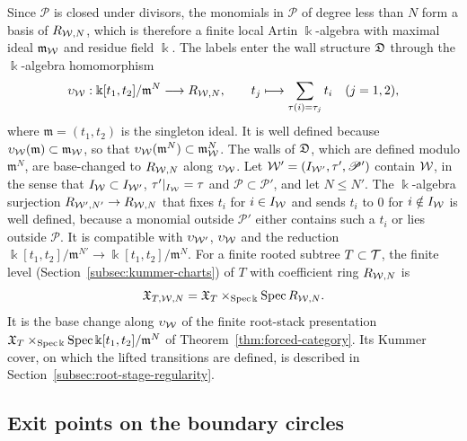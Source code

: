 Since $\mathscr P$ is closed under divisors, the monomials in $\mathscr P$ of degree less than
$N$ form a basis of $R_{\mathcal W,N}$, which is therefore a finite local Artin
$\Bbbk$-algebra with maximal ideal $\mathfrak m_\mathcal W$ and residue field
$\Bbbk$.  The labels enter the wall structure $\mathfrak D$ through the $\Bbbk$-algebra
homomorphism
\begin{equation}\label{eq:window-map}
 \upsilon_\mathcal W:\Bbbk[t_1,t_2]/\mathfrak m^N\longrightarrow R_{\mathcal W,N},
 \qquad
 t_j\longmapsto\sum_{\tau(i)=\tau_j}t_i\quad(j=1,2),
\end{equation}
where $\mathfrak m=(t_1,t_2)$ is the singleton ideal.  It is well defined
because $\upsilon_\mathcal W(\mathfrak m)\subset\mathfrak m_\mathcal W$, so that
$\upsilon_\mathcal W(\mathfrak m^N)\subset\mathfrak m_\mathcal W^N$.  The walls of
$\mathfrak D$, which are defined modulo $\mathfrak m^N$, are base-changed to
$R_{\mathcal W,N}$ along $\upsilon_\mathcal W$.  Let
$\mathcal W'=(I_{\mathcal W'},\tau',\mathscr P')$ contain $\mathcal W$, in the sense that
$I_\mathcal W\subset I_{\mathcal W'}$, $\tau'|_{I_\mathcal W}=\tau$ and
$\mathscr P\subset\mathscr P'$, and let $N\leq N'$.  The $\Bbbk$-algebra surjection
$R_{\mathcal W',N'}\to R_{\mathcal W,N}$ that fixes $t_i$ for $i\in I_\mathcal W$ and
sends $t_i$ to $0$ for $i\notin I_\mathcal W$ is well defined, because a
monomial outside $\mathscr P'$ either contains such a $t_i$ or lies outside $\mathscr P$.  It
is compatible with $\upsilon_{\mathcal W'}$, $\upsilon_\mathcal W$ and the reduction
$\Bbbk[t_1,t_2]/\mathfrak m^{N'}\to\Bbbk[t_1,t_2]/\mathfrak m^N$.  For a
finite rooted subtree $T\subset\mathcal T$, the finite level
(Section~\ref{subsec:kummer-charts}) of $T$ with coefficient ring
$R_{\mathcal W,N}$ is
\[
 \mathfrak X_{T,\mathcal W,N}=\mathfrak X_T\times_{\operatorname{Spec}\Bbbk}\operatorname{Spec} R_{\mathcal W,N}.
\]
It is the base change along $\upsilon_\mathcal W$ of the
finite root-stack presentation
$\mathfrak X_T\times_{\operatorname{Spec}\Bbbk}\operatorname{Spec}\Bbbk[t_1,t_2]/\mathfrak m^N$ of
Theorem~\ref{thm:forced-category}.  Its Kummer cover, on which the lifted
transitions are defined, is described in
Section~\ref{subsec:root-stage-regularity}.

\subsection{Exit points on the boundary circles}

